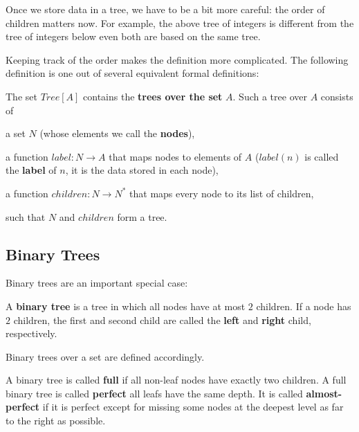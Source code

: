 Once we store data in a tree, we have to be a bit more careful: the order of children matters now.
For example, the above tree of integers is different from the tree of integers below even both are based on the same tree.

\begin{center}
\end{center}

Keeping track of the order makes the definition more complicated.
The following definition is one out of several equivalent formal definitions:

\begin{definition}\label{def:ad:labeledtree}
The set $Tree[A]$ contains the \textbf{trees over the set} $A$.
Such a tree over $A$ consists of
\begin{compactitem}
 \item a set $N$ (whose elements we call the \textbf{nodes}),
 \item a function $label:N\to A$ that maps nodes to elements of $A$ ($label(n)$ is called the \textbf{label} of $n$, it is the data stored in each node),
 \item a function $children:N\to N^*$ that maps every node to its list of children,
\end{compactitem}
such that $N$ and $children$ form a tree.
\end{definition}

\subsection{Binary Trees}

Binary trees are an important special case:

\begin{definition}\label{def:ad:bintree}
A \textbf{binary tree} is a tree in which all nodes have at most $2$ children.
If a node has $2$ children, the first and second child are called the \textbf{left} and \textbf{right} child, respectively.

Binary trees over a set are defined accordingly.

A binary tree is called \textbf{full} if all non-leaf nodes have exactly two children.
A full binary tree is called \textbf{perfect} all leafs have the same depth.
It is called \textbf{almost-perfect} if it is perfect except for missing some nodes at the deepest level as far to the right as possible.
\end{definition}

